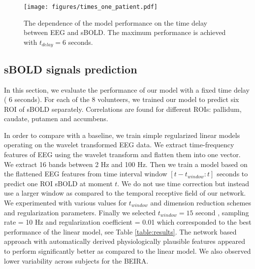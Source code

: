 \documentclass{article}
\begin{document}
\begin{figure}[ht]
    \centering
    \texttt{[image: figures/times\_one\_patient.pdf]}
    \caption{\label{fig:times} The dependence of the model performance on the time delay between EEG and sBOLD. The maximum performance is achieved with $t_{delay} = 6$ seconds.
     }
\end{figure}

\subsection{sBOLD signals prediction}
In this section, we evaluate the performance of our model with a fixed time delay ( 6 seconds). For each of the 8 volunteers, we trained our model to predict six ROI of sBOLD separately. Correlations are found for different ROIs: pallidum, caudate, putamen and accumbens.

In order to compare with a baseline, we train simple regularized linear models operating on the wavelet transformed EEG data. We extract time-frequency features of EEG using the wavelet transform and flatten them into one vector. We extract 16 bands between 2 Hz and 100 Hz.  Then we train a model based on the flattened EEG features from time interval window $[t-t_{window} : t]$ seconds to predict one ROI sBOLD at moment $t$. We do not use time correction but instead use a larger window as compared to the temporal receptive field of our network. We experimented with various values for $t_{window}$ and dimension reduction schemes and regularization parameters. Finally we selected $t_{window} = 15$ second , sampling rate = 10 Hz and regularization coefficient = 0.01 which corresponded to the best performance of the linear model, see Table \ref{table:results}. The network based approach with automatically derived physiologically plausible features appeared to perform significantly better as compared to the linear model. We also observed lower variability across subjects for the BEIRA.
\end{document}
